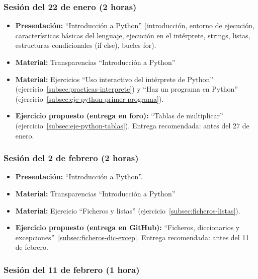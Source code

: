 \documentclass[a4paper,12pt]{article}
\begin{document}
\subsubsection{Sesión del 22 de enero (2 horas)}

\begin{itemize}
\item \textbf{Presentación:} ``Introducción a Python'' (introducción, entorno de ejecución, características básicas del lenguaje, ejecución en el intérprete, strings, listas, estructuras condicionales (if else), bucles for).
\item \textbf{Material:} Transparencias ``Introducción a Python''
\item \textbf{Material:} Ejercicios ``Uso interactivo del intérprete de Python'' (ejercicio~\ref{subsec:practicas-interprete}) y ``Haz un programa en Python'' (ejercicio~\ref{subsec:eje-python-primer-programa}).
\item \textbf{Ejercicio propuesto (entrega en foro):} ``Tablas de multiplicar'' (ejercicio~\ref{subsec:eje-python-tablas}).
   Entrega recomendada: antes del 27 de enero.
\end{itemize}

\subsubsection{Sesión del 2 de febrero (2 horas)}

\begin{itemize}
\item \textbf{Presentación:} ``Introducción a Python''.
\item \textbf{Material:} Transparencias ``Introducción a Python''
\item \textbf{Material:} Ejercicio ``Ficheros y listas'' (ejercicio~\ref{subsec:ficheros-listas}).
\item \textbf{Ejercicio propuesto (entrega en GitHub):} ``Ficheros, diccionarios y excepciones''~\ref{subsec:ficheros-dic-excep}.
   Entrega recomendada: antes del 11 de febrero.
\end{itemize}

\subsubsection{Sesión del 11 de febrero (1 hora)}
\end{document}
